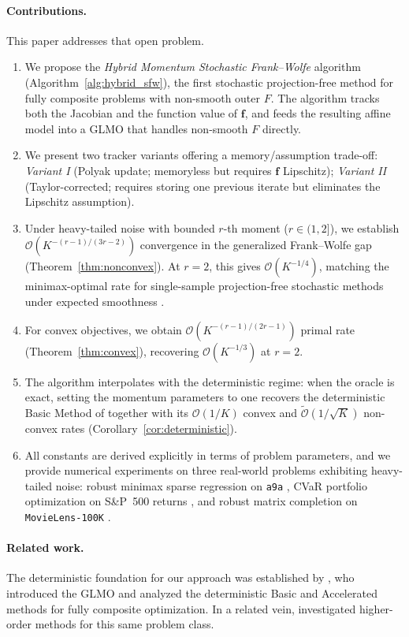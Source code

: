 \documentclass{article}
\def\vf{{\bm{f}}}
\begin{document}
\paragraph{Contributions.} This paper addresses that open problem.
\begin{enumerate}
\item We propose the \emph{Hybrid Momentum Stochastic Frank--Wolfe} algorithm (Algorithm~\ref{alg:hybrid_sfw}), the first stochastic projection-free method for fully composite problems with non-smooth outer $F$. The algorithm tracks both the Jacobian and the function value of $\vf$, and feeds the resulting affine model into a GLMO that handles non-smooth $F$ directly.
\item We present two tracker variants offering a memory/assumption trade-off: \emph{Variant I} (Polyak update; memoryless but requires $\vf$ Lipschitz); \emph{Variant II} (Taylor-corrected; requires storing one previous iterate but eliminates the Lipschitz assumption).
\item Under heavy-tailed noise with bounded $r$-th moment ($r \in (1, 2]$), we establish $\mathcal{O}(K^{-(r-1)/(3r-2)})$ convergence in the generalized Frank--Wolfe gap (Theorem~\ref{thm:nonconvex}). At $r = 2$, this gives $\mathcal{O}(K^{-1/4})$, matching the minimax-optimal rate for single-sample projection-free stochastic methods under expected smoothness \citep{arjevani2023lower}.
\item For convex objectives, we obtain $\mathcal{O}(K^{-(r-1)/(2r-1)})$ primal rate (Theorem~\ref{thm:convex}), recovering $\mathcal{O}(K^{-1/3})$ at $r = 2$.
\item The algorithm interpolates with the deterministic regime: when the oracle is exact, setting the momentum parameters to one recovers the deterministic Basic Method of \citet{vladarean2023first} together with its $\mathcal{O}(1/K)$ convex and $\tilde{\mathcal{O}}(1/\sqrt{K})$ non-convex rates (Corollary~\ref{cor:deterministic}).
\item All constants are derived explicitly in terms of problem parameters, and we provide numerical experiments on three real-world problems exhibiting heavy-tailed noise: robust minimax sparse regression on \texttt{a9a} \citep{chang2011libsvm}, CVaR portfolio optimization on S\&P~500 returns \citep{wrds_compustat}, and robust matrix completion on \texttt{MovieLens-100K} \citep{harper2015movielens}.
\end{enumerate}

\paragraph{Related work.}
The deterministic foundation for our approach was established by \citet{vladarean2023first}, who introduced the GLMO and analyzed the deterministic Basic and Accelerated methods for fully composite optimization. In a related vein, \citet{doikov2022high} investigated higher-order methods for this same problem class.
\end{document}
